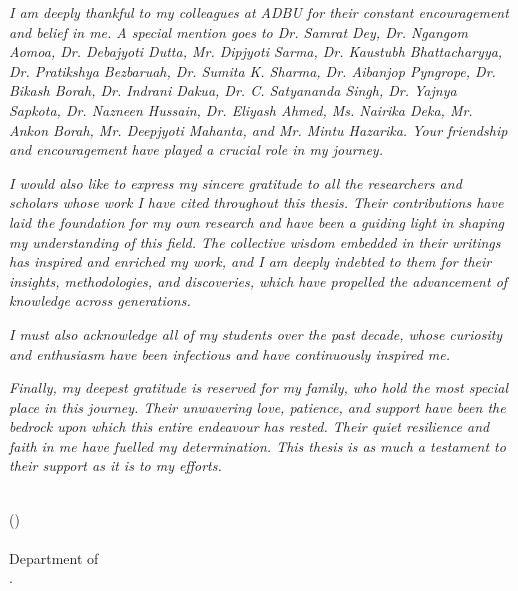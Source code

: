     \newpage
    \par\textsl{I am deeply thankful to my colleagues at ADBU for their constant encouragement and belief in me. A special mention goes to Dr. Samrat Dey, Dr. Ngangom Aomoa, Dr. Debajyoti Dutta, Mr. Dipjyoti Sarma, Dr. Kaustubh Bhattacharyya, Dr. Pratikshya Bezbaruah, Dr. Sumita K. Sharma, Dr. Aibanjop Pyngrope, Dr. Bikash Borah, Dr. Indrani Dakua, Dr. C. Satyananda Singh, Dr. Yajnya Sapkota, Dr. Nazneen Hussain, Dr. Eliyash Ahmed, Ms. Nairika Deka, Mr. Ankon Borah, Mr. Deepjyoti Mahanta, and Mr. Mintu Hazarika. Your friendship and encouragement have played a crucial role in my journey.}
    
    \par\textsl{I would also like to express my sincere gratitude to all the researchers and scholars whose work I have cited throughout this thesis. Their contributions have laid the foundation for my own research and have been a guiding light in shaping my understanding of this field. The collective wisdom embedded in their writings has inspired and enriched my work, and I am deeply indebted to them for their insights, methodologies, and discoveries, which have propelled the advancement of knowledge across generations.}
    
    \par\textsl{I must also acknowledge all of my students over the past decade, whose curiosity and enthusiasm have been infectious and have continuously inspired me.}
    
    \par\textsl{Finally, my deepest gratitude is reserved for my family, who hold the most special place in this journey. Their unwavering love, patience, and support have been the bedrock upon which this entire endeavour has rested. Their quiet resilience and faith in me have fuelled my determination. This thesis is as much a testament to their support as it is to my efforts.}
    
    \bigskip\medskip
    \bigskip\medskip
    \bigskip\medskip\bigskip\medskip
    \noindent\\
    \hfill (\authorname)
    \noindent\\
    \hfill {\submissiontime} \\
    \hfill Department of \department\\
    \hfill \university.